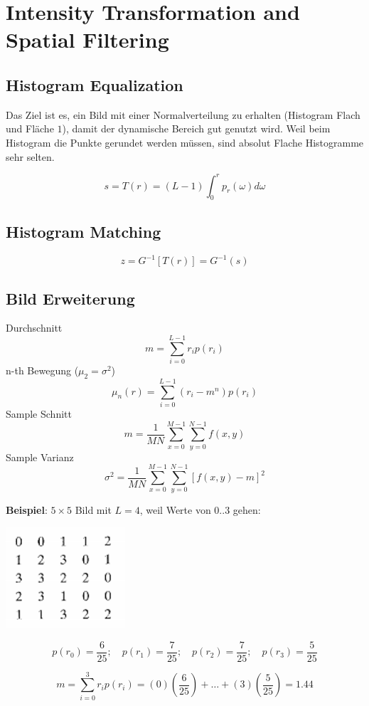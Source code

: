 \section{Intensity Transformation and Spatial Filtering}
\subsection{Histogram Equalization}
Das Ziel ist es, ein Bild mit einer Normalverteilung zu erhalten (Histogram Flach und Fläche $1$), damit der dynamische Bereich gut genutzt wird. Weil beim Histogram die Punkte gerundet werden müssen, sind absolut Flache Histogramme sehr selten.

\[
s = T(r) = (L-1)\int_{0}^{r}p_r(\omega)d\omega
\]

\subsection{Histogram Matching}
\[
z = G^{-1}\left[T(r)\right] = G^{-1}(s)
\]

\subsection{Bild Erweiterung}
Durchschnitt
\[
m = \sum_{i=0}^{L-1}r_ip(r_i)
\]
n-th Bewegung ($\mu_2 = \sigma^2$)
\[
\mu_n(r) = \sum_{i=0}^{L-1}(r_i - m^n)p(r_i)
\]
Sample Schnitt
\[
m = \frac{1}{MN}\sum_{x=0}^{M-1}\sum_{y=0}^{N-1}f(x,y)
\]
Sample Varianz
\[
\sigma^2 = \frac{1}{MN}\sum_{x=0}^{M-1}\sum_{y=0}^{N-1}[f(x,y) -m]^2
\]

\textbf{Beispiel}: $5\times5$ Bild mit $L=4$, weil Werte von $0..3$ gehen:
\begin{center}
	\includegraphics[width=0.2\columnwidth]{Images/histo_ex}
\end{center}
\[
p(r_0) = \frac{6}{25};\quad p(r_1)  = \frac{7}{25};\quad p(r_2) = \frac{7}{25};\quad p(r_3) = \frac{5}{25}
\]

\[
m = \sum_{i=0}^{3}r_ip(r_i) = (0)(\frac{6}{25}) + \dots + (3)(\frac{5}{25}) = 1.44
\]

